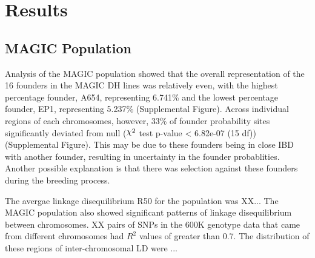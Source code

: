 \documentclass[article,9pt,twocolumn,twoside]{rilabRxiv}
\DeclareRobustCommand{\rchi}{{\mathpalette\irchi\relax}}
\newcommand{\irchi}[2]{\raisebox{\depth}{$#1\chi$}} %
\begin{document}



\section{Results}

\subsection{MAGIC Population}
Analysis of the MAGIC population showed that the overall representation of the 16 founders in the MAGIC DH lines was relatively even, with the highest percentage founder, A654, representing 6.741\% and the lowest percentage founder, EP1, representing 5.237\% (Supplemental Figure). Across individual regions of each chromosomes, however, 33\% of founder probability sites significantly deviated from null ($\rchi^2$ test p-value < 6.82e-07 (15 df)) (Supplemental Figure).
This may be due to these founders being in close IBD with another founder, resulting in uncertainty in the founder probablities. Another possible explanation is that there was selection against these founders during the breeding process.

The avergae linkage disequilibrium R50 for the population was XX...
The MAGIC population also showed significant patterns of linkage disequilibrium between chromosomes. XX pairs of SNPs in the 600K genotype data that came from different chromosomes had $R^2$ values of greater than 0.7. The distribution of these regions of inter-chromosomal LD were ...
\end{document}
